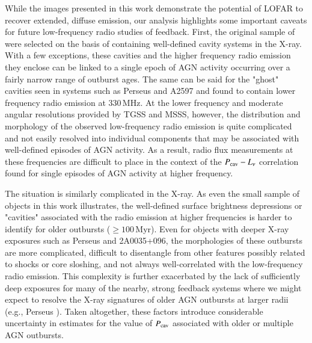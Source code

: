 \documentclass{aa}  %
\begin{document}
While the images presented in this work demonstrate the potential of LOFAR to recover extended, diffuse emission, our analysis highlights some important caveats for future low-frequency radio studies of feedback.
First, the original sample of \cite{Birzan2008} were selected on the basis of containing well-defined cavity systems in the X-ray. With a few exceptions, these cavities and the higher frequency radio emission they enclose can be linked to a single epoch of AGN activity occurring over a fairly narrow range of outburst ages. The same can be said for the "ghost" cavities seen in systems such as Perseus \citep{Fabian2006} and A2597 \citep{Clarke2005} and found to contain lower frequency radio emission at 330\,MHz. At the lower frequency and moderate angular resolutions provided by TGSS and MSSS, however, the distribution and morphology of the observed low-frequency radio emission is quite complicated and not easily resolved into individual components that may be associated with well-defined episodes of AGN activity. As a result, radio flux measurements at these frequencies are difficult to place in the context of the $P_{\rm cav} - L_\nu$ correlation found for single episodes of AGN activity at higher frequency.

The situation is similarly complicated in the X-ray. As even the small sample of objects in this work illustrates, the well-defined surface brightness depressions or "cavities" associated with the radio emission at higher frequencies is harder to identify for older outbursts ($\ge100$\,Myr). Even for objects with deeper X-ray exposures such as Perseus and 2A0035+096, the morphologies of these outbursts are more complicated, difficult to disentangle from other features possibly related to shocks or core sloshing, and not always well-correlated with the low-frequency radio emission. This complexity is further exacerbated by the lack of sufficiently deep exposures for many of the nearby, strong feedback systems where we might expect to resolve the X-ray signatures of older AGN outbursts at larger radii (e.g., Perseus \cite{Fabian2006}). Taken altogether, these factors introduce considerable uncertainty in estimates for the value of $P_{\rm cav}$ associated with older or multiple AGN outbursts.
\end{document}

